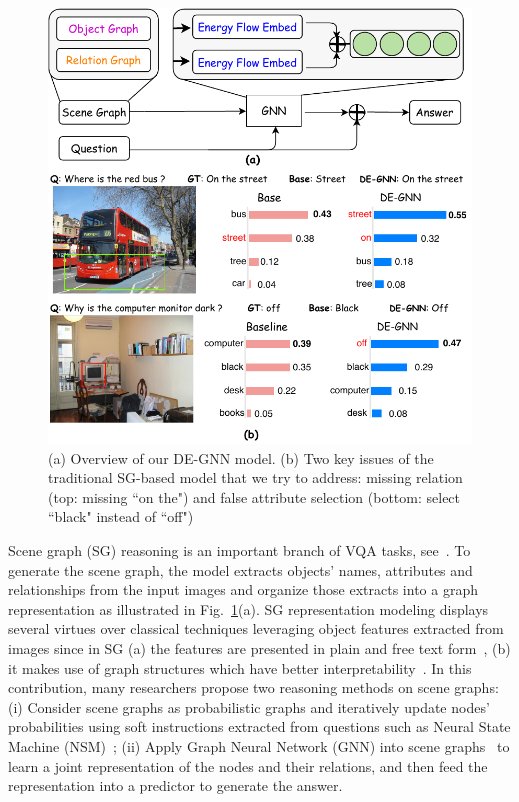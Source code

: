\documentclass[letterpaper]{article} %
\begin{document}
\begin{figure}[ht] 
    \centering 
    \includegraphics[scale=0.6]{./pic/intro4.pdf} 
    \caption{(a) Overview of our DE-GNN model. (b) Two key issues of the traditional SG-based model that we try to address: missing relation (top: missing ``on the") and false attribute selection (bottom: select ``black" instead of ``off")} 
    \label{scene-graph} 
    \vspace{-0.1in}
\end{figure}

Scene graph (SG) reasoning is an important branch of VQA tasks, see~\cite{DBLP:journals/corr/abs-2007-01072}. 
To generate the scene graph, the model extracts objects' names, attributes and relationships from the input images and organize those extracts into a graph representation as illustrated in Fig.~\ref{scene-graph}(a). 
SG representation modeling displays several virtues over classical techniques leveraging object features extracted from images since in SG (a) the features are presented in plain and free text form~\cite{DBLP:journals/corr/abs-2101-05479}, (b) it makes use of graph structures which have better interpretability~\cite{DBLP:conf/bmvc/ZhangCX19}.
In this contribution, many researchers propose two reasoning methods on scene graphs: (i) Consider scene graphs as probabilistic graphs and iteratively update nodes' probabilities using soft instructions extracted from questions such as Neural State Machine (NSM)~\cite{DBLP:conf/nips/HudsonM19,DBLP:conf/ijcnn/LeLV020}; (ii) Apply Graph Neural Network (GNN) into scene graphs~\cite{inproceedings,DBLP:conf/iccv/LiGCL19} to learn a joint representation of the nodes and their relations, and then feed the representation into a predictor to generate the answer.
\end{document}
